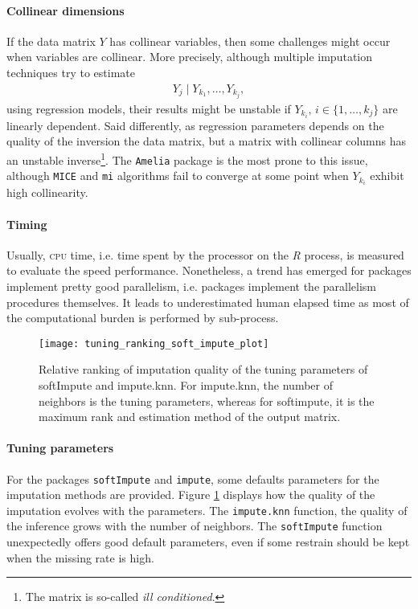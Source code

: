 \paragraph{Collinear dimensions}

If the data matrix $Y$ has collinear variables, then some challenges might occur
when variables are collinear. More precisely, although multiple imputation
techniques try to estimate
\begin{align*}
  Y_j \; |\; Y_{k_1}, \dots, Y_{k_j},
\end{align*}
using regression models, their results might be unstable if
$Y_{k_i},\, i \in \{1, \dots, k_j\}$ are linearly dependent. Said differently, as
regression parameters depends on the quality of the inversion the data matrix,
but a matrix with collinear columns has an unstable inverse\footnote{The matrix
  is so-called \emph{ill conditioned}.}. The \texttt{Amelia}
package is the most prone to this issue, although \texttt{MICE} and \texttt{mi}
algorithms fail to converge at some point when $Y_{k_i}$ exhibit high
collinearity.

\paragraph{Timing}
Usually, \textsc{cpu} time, i.e. time spent by the processor on the \emph{R}
process, is measured to evaluate the speed performance. Nonetheless, a trend
has emerged for packages implement pretty good parallelism, i.e. packages
implement the parallelism procedures themselves. It leads to underestimated
human elapsed time as most of the computational burden is performed by
sub-process.

\begin{figure}
  \centering
  \texttt{[image: tuning\_ranking\_soft\_impute\_plot]}
  \caption{Relative ranking of imputation quality of the tuning parameters of
    softImpute and impute.knn. For impute.knn, the number of neighbors is the
    tuning parameters, whereas for softimpute, it is the maximum rank and estimation
    method of the output matrix.}
  \label{fig:tuning:param:softimpute:imputeknn}
\end{figure}

\paragraph{Tuning parameters}
For the packages \texttt{softImpute} and \texttt{impute}, some defaults
parameters for the imputation methods are provided. Figure
\ref{fig:tuning:param:softimpute:imputeknn} displays how the quality of the
imputation evolves with the parameters. The \texttt{impute.knn} function, the
quality of the inference grows with the number of neighbors. The
\texttt{softImpute} function unexpectedly offers good default parameters, even
if some restrain should be kept when the missing rate is high.

